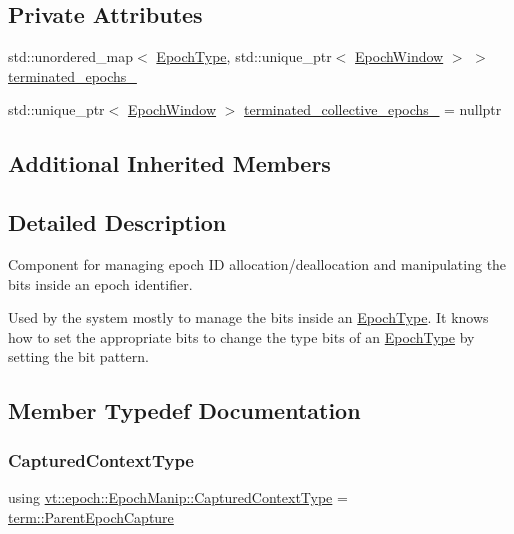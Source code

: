 \subsection*{Private Attributes}
\begin{DoxyCompactItemize}
\item 
std\+::unordered\+\_\+map$<$ \hyperlink{structvt_1_1epoch_1_1_epoch_type}{Epoch\+Type}, std\+::unique\+\_\+ptr$<$ \hyperlink{structvt_1_1epoch_1_1_epoch_window}{Epoch\+Window} $>$ $>$ \hyperlink{structvt_1_1epoch_1_1_epoch_manip_aae06cc3b0a36114406ff318045d1c3fa}{terminated\+\_\+epochs\+\_\+}
\item 
std\+::unique\+\_\+ptr$<$ \hyperlink{structvt_1_1epoch_1_1_epoch_window}{Epoch\+Window} $>$ \hyperlink{structvt_1_1epoch_1_1_epoch_manip_aa686e6a82ce06391ff223eb8ccd9fb7a}{terminated\+\_\+collective\+\_\+epochs\+\_\+} = nullptr
\end{DoxyCompactItemize}
\subsection*{Additional Inherited Members}


\subsection{Detailed Description}
Component for managing epoch ID allocation/deallocation and manipulating the bits inside an epoch identifier. 

Used by the system mostly to manage the bits inside an {\ttfamily \hyperlink{structvt_1_1epoch_1_1_epoch_type}{Epoch\+Type}}. It knows how to set the appropriate bits to change the type bits of an {\ttfamily \hyperlink{structvt_1_1epoch_1_1_epoch_type}{Epoch\+Type}} by setting the bit pattern. 

\subsection{Member Typedef Documentation}
\mbox{\label{structvt_1_1epoch_1_1_epoch_manip_ab1fe66501b6b83b07fd4188fc6a8a4fe}} 
\subsubsection{\texorpdfstring{Captured\+Context\+Type}{CapturedContextType}}
{\footnotesize\ttfamily using \hyperlink{structvt_1_1epoch_1_1_epoch_manip_ab1fe66501b6b83b07fd4188fc6a8a4fe}{vt\+::epoch\+::\+Epoch\+Manip\+::\+Captured\+Context\+Type} =  \hyperlink{structvt_1_1term_1_1_parent_epoch_capture}{term\+::\+Parent\+Epoch\+Capture}}



